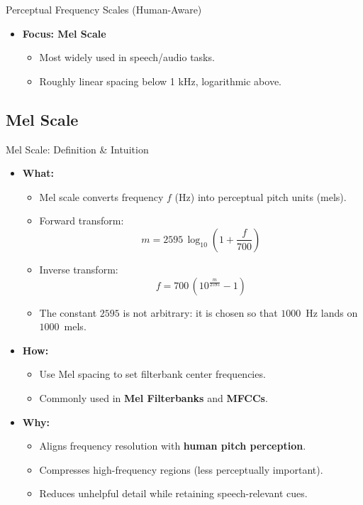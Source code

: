 \begin{frame}[allowframebreaks]{Perceptual Frequency Scales (Human-Aware)}
\begin{itemize}
        \item \textbf{Focus: Mel Scale}
        \begin{itemize}
            \item Most widely used in speech/audio tasks.
            \item Roughly linear spacing below 1 kHz, logarithmic above.
        \end{itemize}
    \end{itemize}
\end{frame}

\subsection{Mel Scale}
\begin{frame}[allowframebreaks]{Mel Scale: Definition \& Intuition}

\begin{itemize}
    \item \textbf{What:}
    \begin{itemize}
        \item Mel scale converts frequency $f$ (Hz) into perceptual pitch units (mels).
        \item Forward transform:
        \[
            m = 2595 \, \log_{10}\left(1 + \frac{f}{700}\right)
        \]
        \item Inverse transform:
        \[
            f = 700 \, \left(10^{\tfrac{m}{2595}} - 1\right)
        \]
        \item The constant $2595$ is not arbitrary: it is chosen so that $1000$~Hz lands on $1000$~mels.
    \end{itemize}

    \item \textbf{How:}
    \begin{itemize}
        \item Use Mel spacing to set filterbank center frequencies.
        \item Commonly used in \textbf{Mel Filterbanks} and \textbf{MFCCs}.
    \end{itemize}
\framebreak

    \item \textbf{Why:}
    \begin{itemize}
        \item Aligns frequency resolution with \textbf{human pitch perception}.
        \item Compresses high-frequency regions (less perceptually important).
        \item Reduces unhelpful detail while retaining speech-relevant cues.
    \end{itemize}


\end{itemize}
\end{frame}
